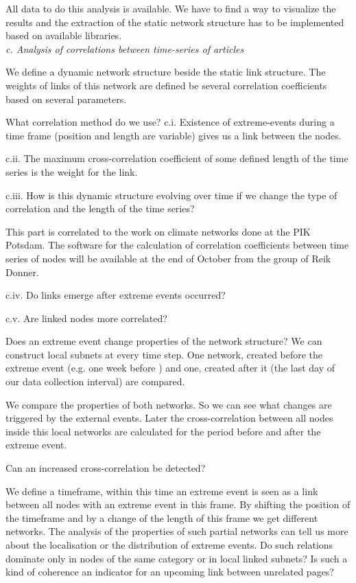 \documentclass[a4paper,10pt]{scrbook}
\begin{document}
All data to do this analysis is available. We have to find a way to visualize the 
results and the extraction of the static network structure has to be implemented 
based on available libraries.\\

\textit{c. Analysis of correlations between time-series of articles}

We define a dynamic network structure beside the static link structure. The weights 
of links of this network are defined be several correlation coefficients based on several parameters. 

What correlation method do we use?
c.i. Existence of extreme-events during a time frame (position and length are variable) gives us a link between the nodes.

c.ii.  The maximum cross-correlation coefficient of some defined length of the time series is the weight for the link. 

c.iii. How is this dynamic structure evolving over time if we change the type of correlation and the length of the time series?

This part is correlated to the work on climate networks done at the PIK  Potsdam. The software for the calculation of correlation coefficients between time series of nodes will be available at the end of October from the group of Reik Donner.

c.iv. Do links emerge after extreme events occurred?

c.v. Are linked nodes more correlated?

Does an extreme event change properties of the network structure? We can construct local 
subnets at every time step. One network, created before the extreme event (e.g. one week before ) 
and one, created after it (the last day of our data collection interval) are compared. 

We compare the properties of both networks. So we can see what changes are triggered by the external events. 
Later the cross-correlation between all nodes inside this local networks are calculated for the period 
before and after the extreme event.

Can an increased cross-correlation be detected? 

We define a timeframe, within this time an extreme event is seen as a link between all nodes with an extreme 
event in this frame. By shifting the position of the timeframe and by a change of the length of this frame 
we get different networks. The analysis of the properties of such partial networks can tell us more about the 
localisation or the distribution of extreme events. Do such relations dominate only in nodes of the same 
category or in local linked subnets? Is such a kind of coherence an indicator for an upcoming link between 
unrelated pages?   \\
\end{document}
